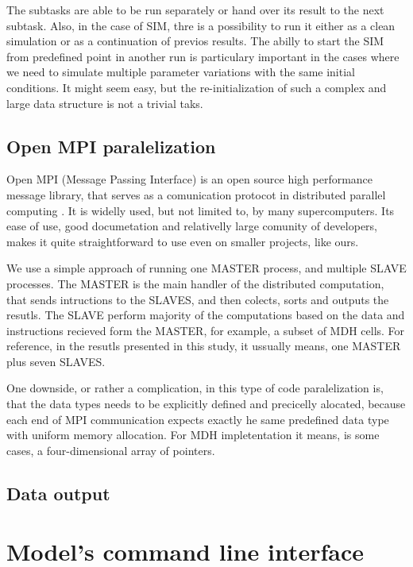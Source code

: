     The subtasks are able to be run separately or hand over its result to the next subtask. Also, in the case of SIM, thre is a possibility to run it either as a clean simulation or as a continuation of previos results. The abilly to start the SIM from predefined point in another run is particulary important in the cases where we need to simulate multiple parameter variations with the same initial conditions. It might seem easy, but the re-initialization of such a complex and large data structure is not a trivial taks. 

\subsection{Open MPI paralelization}
    Open MPI (Message Passing Interface) is an open source high performance message library, that serves as a comunication protocot in distributed parallel computing \citep{openmpi2022}. It is widelly used, but not limited to, by many supercomputers. Its ease of use, good documetation and relativelly large comunity of developers, makes it quite straightforward to use even on smaller projects, like ours. 

    We use a simple approach of running one MASTER process, and multiple SLAVE processes. The MASTER is the main handler of the distributed computation, that sends intructions to the SLAVES, and then colects, sorts and outputs the resutls. The SLAVE perform majority of the computations based on the data and instructions recieved form the MASTER, for example, a subset of MDH cells. For reference, in the resutls presented in this study, it ussually means, one MASTER plus seven SLAVES.

    One downside, or rather a complication, in this type of code paralelization is, that the data types needs to be explicitly defined and precicelly alocated, because each end of MPI communication expects exactly he same predefined data type with uniform memory allocation. For MDH impletentation it means, is some cases, a four-dimensional array of pointers.

\subsection{Data output}

\section{Model's command line interface}


